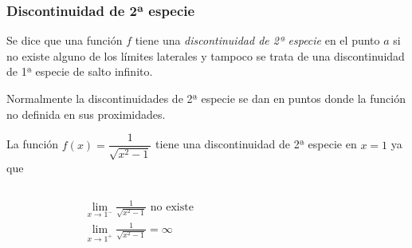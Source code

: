 \begin{frame}
\frametitle{Discontinuidad de 2ª especie}
\begin{definicion}
Se dice que una función $f$ tiene una \emph{discontinuidad de 2ª especie} en el punto $a$ si
no existe alguno de los límites laterales y tampoco se trata de una discontinuidad de 1ª especie de salto infinito.
\end{definicion}

Normalmente la discontinuidades de 2ª especie se dan en puntos donde la función no definida en sus proximidades.

 La función $f(x)=\dfrac{1}{\sqrt{x^2-1}}$ tiene una discontinuidad de 2ª especie en $x=1$ ya que
\begin{columns}
\begin{column}{0.3\textwidth}
\begin{align*}
& \lim_{x\rightarrow 1^-}\frac{1}{\sqrt{x^2-1}} \textrm{ no existe}  \\
& \lim_{x\rightarrow 1^+}\frac{1}{\sqrt{x^2-1}}=\infty
\end{align*}
\end{column}
\begin{column}{0.5\textwidth}
\begin{center}
\scalebox{1}{}
\end{center}
\end{column}
\end{columns}
\end{frame} 
